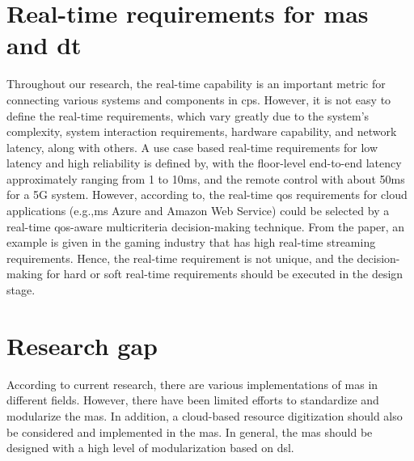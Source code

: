 \section{Real-time requirements for \gls{mas} and \gls{dt}}
Throughout our research, the real-time capability is an important metric for connecting 
various systems and components in \gls{cps}. However, it is not easy to define the 
real-time requirements, which vary greatly due to the system's complexity, 
system interaction requirements, hardware capability, and network latency, 
along with others. 
A use case based real-time requirements for low latency and high reliability 
is defined by\cite{li_5g_2018}, with the floor-level end-to-end latency 
approximately ranging from 1 to 10ms, and the remote control with about 50ms for a 5G 
system. However, according to\cite{zhang_infrastructure_2017}, the real-time 
\gls{qos} requirements for cloud applications (e.g.,\gls{ms} Azure and Amazon Web Service) 
could be selected by a real-time \gls{qos}-aware multicriteria decision-making 
technique. From the paper, an example is given in the gaming industry that has 
high real-time streaming requirements. Hence, the real-time requirement is not unique, and the decision-making for hard or 
soft real-time requirements should be executed in the design stage. 

\section{Research gap}

According to current research, there are various implementations of \gls{mas} in 
different fields. However, there have been limited efforts to standardize and 
modularize the \gls{mas}. In addition, a cloud-based resource digitization should also 
be considered and implemented in the \gls{mas}. In general, the \gls{mas} should be designed 
with a high level of modularization based on \gls{dsl}.

